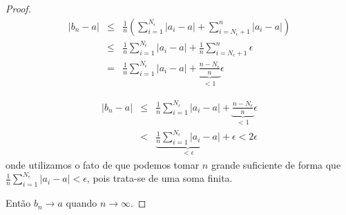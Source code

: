 \begin{frame}[allowframebreaks]
\begin{proof}
	\begin{eqnarray}
        \vert b_n - a \vert &\leq& \frac{1}{n} \left( \sum_{i=1}^{N_{\epsilon}} \vert a_i - a \vert + \sum_{i=N_{\epsilon}+1}^n \vert a_i - a \vert \right) \nonumber \\
		&\leq& \frac{1}{n} \sum_{i=1}^{N_{\epsilon}} \vert a_i - a \vert + \frac{1}{n}  \sum_{i=N_{\epsilon}+1}^n \epsilon \nonumber \\
		&=& \frac{1}{n} \sum_{i=1}^{N_{\epsilon}} \vert a_i - a \vert + \underbrace{\frac{n - N_{\epsilon}}{n}}_{<1} \epsilon 
        \end{eqnarray}

  \proofbreak

        \begin{eqnarray}
	\vert b_n - a \vert &\leq& \frac{1}{n} \sum_{i=1}^{N_{\epsilon}} \vert a_i - a \vert + \underbrace{\frac{n - N_{\epsilon}}{n}}_{<1} \epsilon \nonumber \\
		&<& \underbrace{ \frac{1}{n} \sum_{i=1}^{N_{\epsilon}} \vert a_i - a \vert }_{< \epsilon } + \epsilon < 2\epsilon
	\end{eqnarray}
	onde utilizamos o fato de que podemos tomar $n$ grande suficiente de forma que $\frac{1}{n} \sum_{i=1}^{N_{\epsilon}} \vert a_i - a \vert < \epsilon$,
	pois trata-se de uma soma finita.

	Então $b_n \rightarrow a$ quando $n \rightarrow \infty$.
  \end{proof}

\end{frame}


